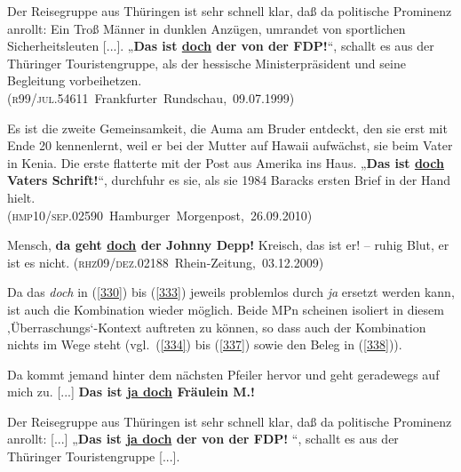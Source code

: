 \begin{exe}
	\ex\label{331}
 
	Der Reisegruppe aus Thüringen ist sehr schnell klar, daß da politische Prominenz anrollt: Ein Troß Männer in dunklen Anzügen, umrandet von sportlichen 	Sicherheitsleuten [...].  „\textbf{Das ist \underline{doch} der von der FDP!}“, schallt es aus der Thüringer Touristengruppe, als der 			hessische Ministerpräsident und seine Begleitung vorbeihetzen.\\     
	\hbox{}\hfill\hbox{(\textsc{r99/jul.54611} Frankfurter Rundschau, 09.07.1999)}	
\end{exe}				
							
\begin{exe}
	\ex\label{332}
 
	Es ist die zweite Gemeinsamkeit, die Auma am Bruder entdeckt, den sie erst mit Ende 20 kennenlernt, weil er bei der Mutter auf Hawaii aufwächst, sie beim Vater in Kenia. Die erste flatterte mit der Post aus Amerika ins Haus. „\textbf{Das ist \underline{doch} Vaters Schrift!}“, durchfuhr es sie, als sie 1984 Baracks ersten Brief in der Hand hielt.\\
	\hbox{}\hfill\hbox{(\textsc{hmp10/sep.02590} Hamburger Morgenpost, 26.09.2010)}	
\end{exe}
		
\begin{exe}
	\ex\label{333}
 
	Mensch, \textbf{da geht \underline{doch} der Johnny Depp!} Kreisch, das ist er! – ruhig Blut, er ist es nicht.    
	\hfill\hbox{(\textsc{rhz09/dez.02188} Rhein-Zeitung, 03.12.2009)}	
\end{exe}	                                                                
Da das \textit{doch} in (\ref{330}) bis (\ref{333}) jeweils problemlos durch \textit{ja} ersetzt werden kann, ist auch die Kombination wieder möglich. Beide MPn scheinen isoliert in diesem ‚Überraschungs‘-Kontext auftreten zu können, so dass auch der Kombination nichts im Wege steht (vgl.\ (\ref{334}) bis (\ref{337}) sowie den Beleg in (\ref{338})).

\begin{exe}
	\ex\label{334}
 
	Da kommt jemand hinter dem nächsten Pfeiler hervor und geht geradewegs auf mich zu. [...] \textbf{Das ist \underline{ja doch} Fräulein M.!}	
\end{exe}	

\begin{exe}
	\ex\label{335}
 
	Der Reisegruppe aus Thüringen ist sehr schnell klar, daß da politische Prominenz anrollt: [...]  „\textbf{Das ist \underline{ja doch} der von der FDP!}			“, schallt es aus der Thüringer Touristengruppe [...].
\end{exe}

